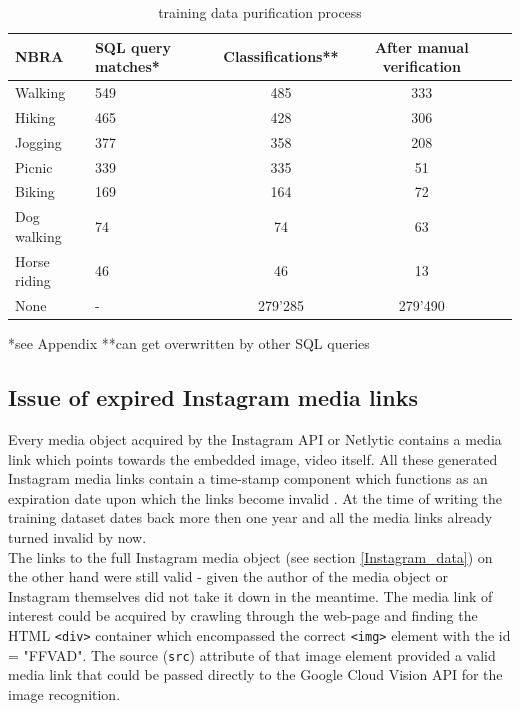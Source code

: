 \begin{table}[ht]
\begin{center}
\caption{training data purification process}\vspace{1ex}
\label{tab:trainingsdata}
\begin{tabular}{llccc}\hline
NBRA & SQL query matches* & Classifications** & After manual verification \\ \hline
Walking & 549 & 485 & 333 \\
Hiking & 465 & 428 & 306 \\
Jogging & 377 & 358 & 208 \\
Picnic & 339 & 335 & 51 \\
Biking & 169 & 164 & 72 \\
Dog walking & 74 & 74 & 63 \\
Horse riding & 46 & 46 & 13 \\
None & - & 279'285 & 279'490 \\ \hline
\end{tabular}
\newline
*see Appendix **can get overwritten by other SQL queries
\end{center}
\end{table}

\subsection{Issue of expired Instagram media links} \label{expired_media_links}
Every media object acquired by the Instagram API or Netlytic contains a media link which points towards the embedded image, video itself. All these generated Instagram media links contain a time-stamp component which functions as an expiration date upon which the links become invalid \parencite{Wayne2018}. At the time of writing the training dataset dates back more then one year and all the media links already turned invalid by now. \\ %
The links to the full Instagram media object (see section \ref{Instagram_data}) on the other hand were still valid - given the author of the media object or Instagram themselves did not take it down in the meantime. The media link of interest could be acquired by crawling through the web-page and finding the HTML \texttt{<div>} container which encompassed the correct \texttt{<img>} element with the id = "FFVAD". The source (\texttt{src}) attribute of that image element provided a valid media link that could be passed directly to the Google Cloud Vision API for the image recognition.

